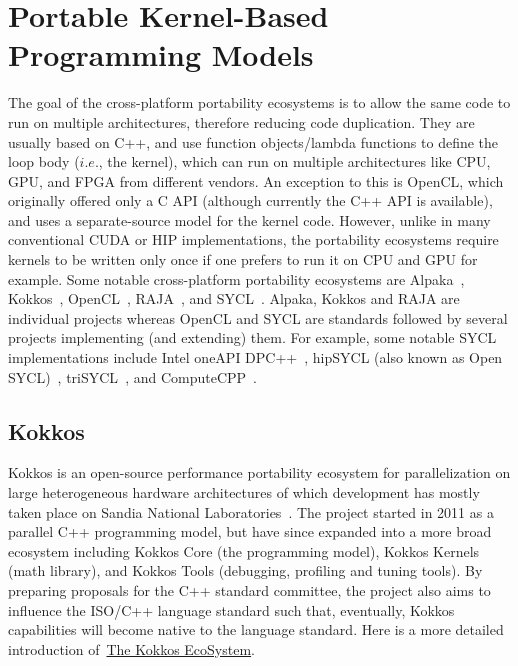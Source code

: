 \section{Portable Kernel-Based Programming Models}\label{sec:portable-kernel-based-programming-models}


\par
The goal of the cross-platform portability ecosystems is to allow the same code to run on multiple architectures, therefore reducing code duplication.
They are usually based on C++, and use function objects/lambda functions to define the loop body ($i.e.$, the kernel), which can run on multiple architectures like CPU, GPU, and FPGA from different vendors.
An exception to this is OpenCL, which originally offered only a C API (although currently the C++ API is available), and uses a separate-source model for the kernel code. 
However, unlike in many conventional CUDA or HIP implementations, the portability ecosystems require kernels to be written only once if one prefers to run it on CPU and GPU for example.
Some notable cross-platform portability ecosystems are Alpaka~\cite{alpaka}, Kokkos~\cite{kokkos}, OpenCL~\cite{OpenCL}, RAJA~\cite{raja}, and SYCL~\cite{sycl}.
Alpaka, Kokkos and RAJA are individual projects whereas OpenCL and SYCL are standards followed by several projects implementing (and extending) them.
For example, some notable SYCL implementations include Intel oneAPI DPC++~\cite{oneapi-dpc}, hipSYCL (also known as Open SYCL)~\cite{hipsycl}, triSYCL~\cite{trisycl}, and ComputeCPP~\cite{computecpp}.




\subsection{Kokkos}


\par
Kokkos is an open-source performance portability ecosystem for parallelization on large heterogeneous hardware architectures of which development has mostly taken place on Sandia National Laboratories~\cite{kokkos, kokkos_sandia}.
The project started in 2011 as a parallel C++ programming model, but have since expanded into a more broad ecosystem including Kokkos Core (the programming model), Kokkos Kernels (math library), and Kokkos Tools (debugging, profiling and tuning tools).
By preparing proposals for the C++ standard committee, the project also aims to influence the ISO/C++ language standard such that, eventually, Kokkos capabilities will become native to the language standard.
Here is a more detailed introduction of~\href{https://www.sandia.gov/news/publications/hpc-annual-reports/article/kokkos/}{The Kokkos EcoSystem}.


